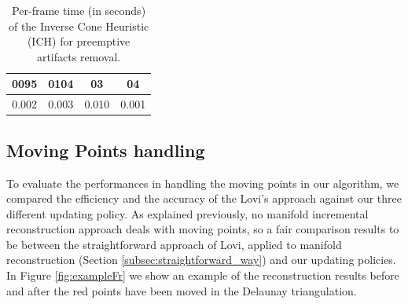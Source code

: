 \begin{table}[t]
  \caption{Per-frame time (in seconds) of the Inverse Cone Heuristic (ICH) for preemptive artifacts removal.}
   \label{tab:inverseTiming}
   \centering
   \begin{tabular}{cccc}
   \toprule  
     0095  & 0104&03 & 04     \\
   \hline
     0.002 & 0.003& 0.010 & 0.001  \\
    \bottomrule
  \end{tabular}
  \end{table} 






\subsection{Moving Points handling}

To evaluate the performances in handling the moving points in our algorithm, we compared the efficiency and the accuracy of the Lovi's approach against our three different updating policy.
As explained previously, no manifold incremental reconstruction approach deals with moving points, so a fair comparison results to be between the straightforward approach of Lovi, applied to manifold reconstruction (Section \ref{subsec:straightforward_way}) and our updating policies. In Figure \ref{fig:exampleFr} we show an example of the reconstruction results before and after the red points have been moved in the Delaunay triangulation.

